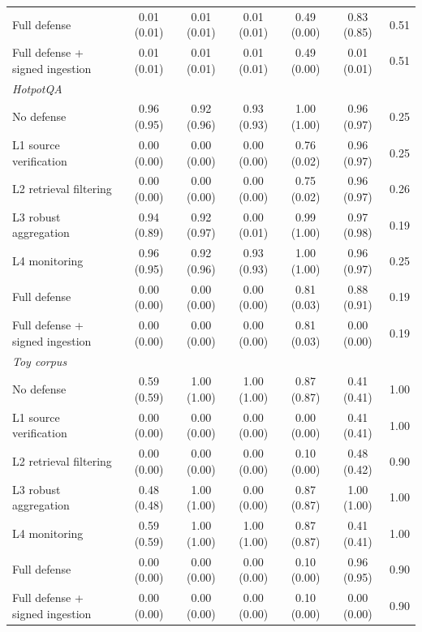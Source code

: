 \documentclass[information,article,submit,moreauthors]{Definitions/mdpi}
\begin{document}
\begin{table}[H]
\begin{tabular}{lcccccc}
\quad Full defense & 0.01 \tiny(0.01) & 0.01 \tiny(0.01) & 0.01 \tiny(0.01) & 0.49 \tiny(0.00) & 0.83 \tiny(0.85) & 0.51\\
\quad Full defense + signed ingestion & 0.01 \tiny(0.01) & 0.01 \tiny(0.01) & 0.01 \tiny(0.01) & 0.49 \tiny(0.00) & 0.01 \tiny(0.01) & 0.51\\
\multicolumn{7}{l}{\textit{HotpotQA}}\\
\quad No defense & 0.96 \tiny(0.95) & 0.92 \tiny(0.96) & 0.93 \tiny(0.93) & 1.00 \tiny(1.00) & 0.96 \tiny(0.97) & 0.25\\
\quad L1 source verification & 0.00 \tiny(0.00) & 0.00 \tiny(0.00) & 0.00 \tiny(0.00) & 0.76 \tiny(0.02) & 0.96 \tiny(0.97) & 0.25\\
\quad L2 retrieval filtering & 0.00 \tiny(0.00) & 0.00 \tiny(0.00) & 0.00 \tiny(0.00) & 0.75 \tiny(0.02) & 0.96 \tiny(0.97) & 0.26\\
\quad L3 robust aggregation & 0.94 \tiny(0.89) & 0.92 \tiny(0.97) & 0.00 \tiny(0.01) & 0.99 \tiny(1.00) & 0.97 \tiny(0.98) & 0.19\\
\quad L4 monitoring & 0.96 \tiny(0.95) & 0.92 \tiny(0.96) & 0.93 \tiny(0.93) & 1.00 \tiny(1.00) & 0.96 \tiny(0.97) & 0.25\\
\quad Full defense & 0.00 \tiny(0.00) & 0.00 \tiny(0.00) & 0.00 \tiny(0.00) & 0.81 \tiny(0.03) & 0.88 \tiny(0.91) & 0.19\\
\quad Full defense + signed ingestion & 0.00 \tiny(0.00) & 0.00 \tiny(0.00) & 0.00 \tiny(0.00) & 0.81 \tiny(0.03) & 0.00 \tiny(0.00) & 0.19\\
\multicolumn{7}{l}{\textit{Toy corpus}}\\
\quad No defense & 0.59 \tiny(0.59) & 1.00 \tiny(1.00) & 1.00 \tiny(1.00) & 0.87 \tiny(0.87) & 0.41 \tiny(0.41) & 1.00\\
\quad L1 source verification & 0.00 \tiny(0.00) & 0.00 \tiny(0.00) & 0.00 \tiny(0.00) & 0.00 \tiny(0.00) & 0.41 \tiny(0.41) & 1.00\\
\quad L2 retrieval filtering & 0.00 \tiny(0.00) & 0.00 \tiny(0.00) & 0.00 \tiny(0.00) & 0.10 \tiny(0.00) & 0.48 \tiny(0.42) & 0.90\\
\quad L3 robust aggregation & 0.48 \tiny(0.48) & 1.00 \tiny(1.00) & 0.00 \tiny(0.00) & 0.87 \tiny(0.87) & 1.00 \tiny(1.00) & 1.00\\
\quad L4 monitoring & 0.59 \tiny(0.59) & 1.00 \tiny(1.00) & 1.00 \tiny(1.00) & 0.87 \tiny(0.87) & 0.41 \tiny(0.41) & 1.00\\
\quad Full defense & 0.00 \tiny(0.00) & 0.00 \tiny(0.00) & 0.00 \tiny(0.00) & 0.10 \tiny(0.00) & 0.96 \tiny(0.95) & 0.90\\
\quad Full defense + signed ingestion & 0.00 \tiny(0.00) & 0.00 \tiny(0.00) & 0.00 \tiny(0.00) & 0.10 \tiny(0.00) & 0.00 \tiny(0.00) & 0.90\\
\bottomrule
\end{tabular}
\end{table}
\end{document}

